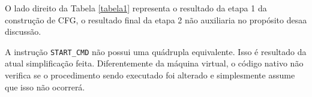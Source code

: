 




O lado direito da Tabela \ref{tabela1} representa o resultado da etapa
1 da construção de CFG, o resultado final da etapa 2 não auxiliaria no
propósito desaa discussão.

A instrução \verb!START_CMD!
não possui uma quádrupla equivalente. Isso é resultado da
atual simplificação feita. Diferentemente
da máquina virtual, o código nativo não verifica se o procedimento
sendo executado foi alterado e simplesmente assume que isso não
ocorrerá.

